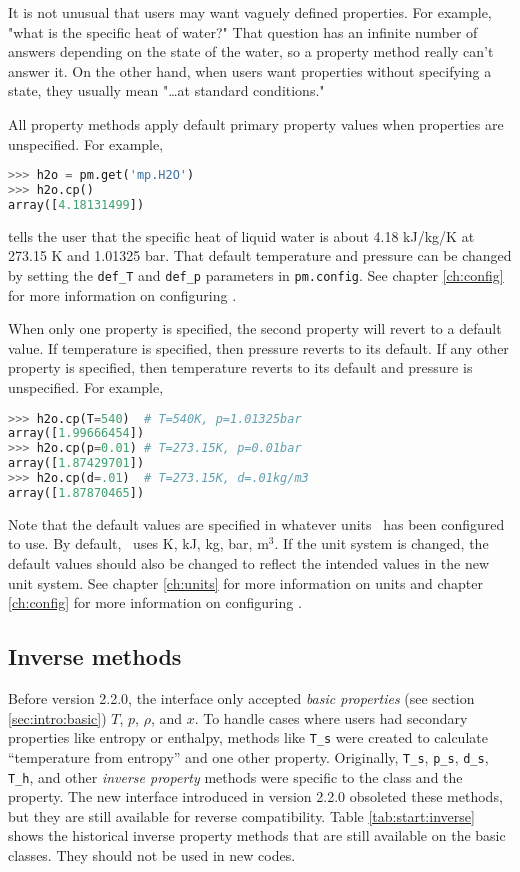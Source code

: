 It is not unusual that users may want vaguely defined properties.  For example, "what is the specific heat of water?"  That question has an infinite number of answers depending on the state of the water, so a property method really can't answer it.  On the other hand, when users want properties without specifying a state, they usually mean "\ldots at standard conditions."

All property methods apply default primary property values when properties are unspecified.  For example,
\begin{lstlisting}[language=Python]
>>> h2o = pm.get('mp.H2O')
>>> h2o.cp()
array([4.18131499])
\end{lstlisting}
tells the user that the specific heat of liquid water is about 4.18 kJ/kg/K at 273.15 K and 1.01325 bar.  That default temperature and pressure can be changed by setting the \verb|def_T| and \verb|def_p| parameters in \texttt{pm.config}.  See chapter \ref{ch:config} for more information on configuring \PM.

When only one property is specified, the second property will revert to a default value.  If temperature is specified, then pressure reverts to its default.  If any other property is specified, then temperature reverts to its default and pressure is unspecified.  For example,
\begin{lstlisting}[language=Python]
>>> h2o.cp(T=540)  # T=540K, p=1.01325bar
array([1.99666454])
>>> h2o.cp(p=0.01) # T=273.15K, p=0.01bar
array([1.87429701])
>>> h2o.cp(d=.01)  # T=273.15K, d=.01kg/m3
array([1.87870465])
\end{lstlisting}

Note that the default values are specified in whatever units \PM\ has been configured to use.  By default, \PM\ uses K, kJ, kg, bar, m$^3$.  If the unit system is changed, the default values should also be changed to reflect the intended values in the new unit system.  See chapter \ref{ch:units} for more information on units and chapter \ref{ch:config} for more information on configuring \PM.

\subsection{Inverse methods}\label{sec:start:inverse}

Before version 2.2.0, the interface only accepted \emph{basic properties} (see section \ref{sec:intro:basic}) $T$, $p$, $\rho$, and $x$.  To handle cases where users had secondary properties like entropy or enthalpy, methods like \verb|T_s| were created to calculate ``temperature from entropy'' and one other property.  Originally, \verb|T_s|, \verb|p_s|, \verb|d_s|, \verb|T_h|, and other \emph{inverse property} methods were specific to the class and the property.  The new interface introduced in version 2.2.0 obsoleted these methods, but they are still available for reverse compatibility.  Table \ref{tab:start:inverse} shows the historical inverse property methods that are still available on the basic classes.  They should not be used in new codes.

